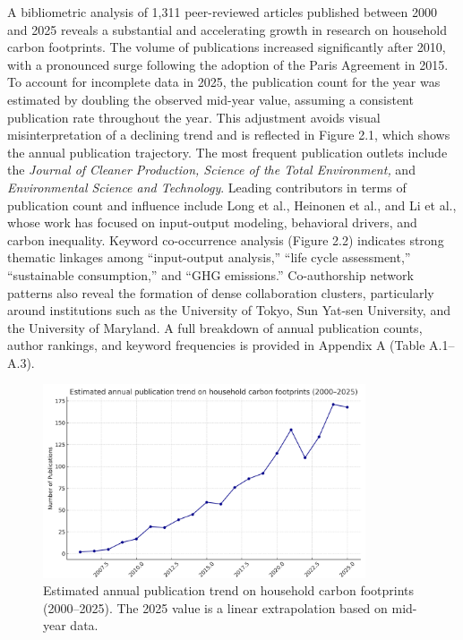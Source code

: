 \documentclass[12pt,a4paper]{article}%
\begin{document}
A bibliometric analysis of 1,311 peer-reviewed articles published between 2000 and 2025 reveals a substantial and accelerating growth in research on household carbon footprints. The volume of publications increased significantly after 2010, with a pronounced surge following the adoption of the Paris Agreement in 2015. To account for incomplete data in 2025, the publication count for the year was estimated by doubling the observed mid-year value, assuming a consistent publication rate throughout the year. This adjustment avoids visual misinterpretation of a declining trend and is reflected in Figure 2.1, which shows the annual publication trajectory. The most frequent publication outlets include the \textit{Journal of Cleaner Production, Science of the Total Environment,} and \textit{Environmental Science and Technology}. Leading contributors in terms of publication count and influence include Long et al., Heinonen et al., and Li et al., whose work has focused on input-output modeling, behavioral drivers, and carbon inequality. Keyword co-occurrence analysis (Figure 2.2) indicates strong thematic linkages among “input-output analysis,” “life cycle assessment,” “sustainable consumption,” and “GHG emissions.” Co-authorship network patterns also reveal the formation of dense collaboration clusters, particularly around institutions such as the University of Tokyo, Sun Yat-sen University, and the University of Maryland. A full breakdown of annual publication counts, author rankings, and keyword frequencies is provided in Appendix A (Table A.1–A.3).

\begin{figure}[htbp]
    \centering
    \includegraphics[width=0.85\textwidth]{publication_trend_darkblue_estimated2025.png}
    \caption{Estimated annual publication trend on household carbon footprints (2000–2025). The 2025 value is a linear extrapolation based on mid-year data.}
\end{figure}
\end{document}

